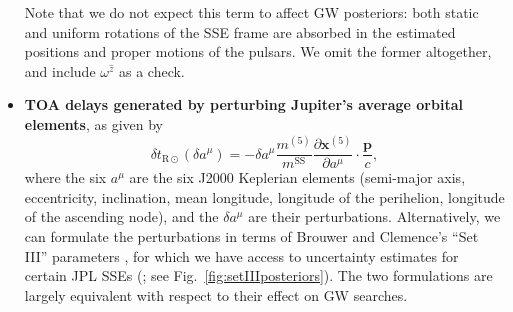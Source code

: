 \documentclass{aastex63}
\begin{document}
\begin{itemize}
Note that we do not expect this term to affect GW posteriors: both static and uniform rotations of the SSE frame are absorbed in the estimated positions and proper motions of the pulsars. We omit the former altogether, and include $\omega^{\hat{z}}$ as a check.
%
\item \textbf{TOA delays generated by perturbing Jupiter's average orbital elements}, as given by
\begin{equation}
\label{eq:orbitperturb}
    \delta t_{\mathrm{R}\odot}(\delta a^\mu) = -\delta a^\mu
    \frac{m^{(5)}}{m^\mathrm{SS}} \frac{\partial \mathbf{x}^{(5)}}{\partial a^\mu} \cdot \frac{\mathbf{p}}{c},
\end{equation}
%
where the six $a^\mu$ are the six J2000 Keplerian elements (semi-major axis, eccentricity, inclination, mean longitude, longitude of the perihelion, longitude of the ascending node), and the $\delta a^\mu$ are their perturbations. Alternatively, we can formulate the perturbations in terms of Brouwer and Clemence's ``Set III'' parameters \citep{1961mcm..book.....B}, for which we have access to uncertainty estimates for certain JPL SSEs (\citealt{de434,de438}; see Fig.\ \ref{fig:setIIIposteriors}). The two formulations are largely equivalent with respect to their effect on GW searches.


\end{itemize}
\end{document}
